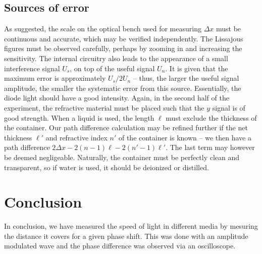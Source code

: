 \documentclass[11pt]{article}
\begin{document}
        \subsection{Sources of error}
        As suggested, the scale on the optical bench used for measuring $\Delta x$ must be continuous and accurate, which may be verified independently.
        The Lissajous figures must be observed carefully, perhaps by zooming in and increasing the sensitivity.
        The internal circuitry also leads to the appearance of a small interference signal $U_s$, on top of the useful signal $U_n$.
        It is given that the maximum error is approximately $U_s / 2U_n$ -- thus, the larger the useful signal amplitude, the smaller the systematic
        error from this source. Essentially, the diode light should have a good intensity. Again, in the second half of the experiment,
        the refractive material must be placed such that the $y$ signal is of good strength. When a liquid is used, the length $\ell$ must
        exclude the thickness of the container. Our path difference calculation may be refined further if the net thickness $\ell'$ and refractive
        index $n'$ of the container is known -- we then have a path difference $2\Delta x - 2(n - 1)\ell - 2(n' - 1)\ell'$. The last term
        may however be deemed negligeable. Naturally, the container must be perfectly clean and transparent, so if water is used,
        it should be deionized or distilled.

        
        \section{Conclusion}
        In conclusion, we have measured the speed of light in different media by mesuring the distance it covers for a given phase shift.
        This was done with an amplitude modulated wave and the phase difference was observed via an oscilloscope.

\end{document}
